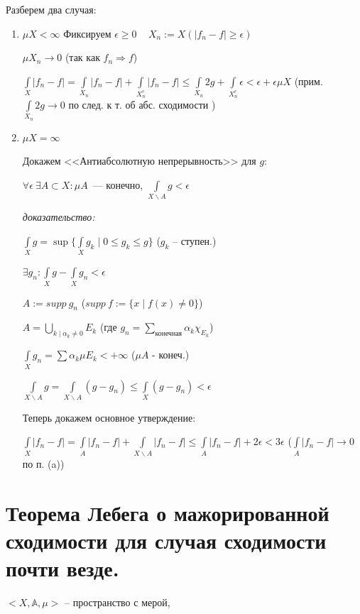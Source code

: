 \documentclass[paper=a4, fontsize=17pt]{article}
\begin{document}
\begin{flushleft}
\begin{enumerate}
	Разберем два случая:
	\begin{enumerate}
		\item $ \mu X < \infty $
		Фиксируем $ \epsilon \ge 0 $ ~ $ X_n := X(|f_n - f| \geq \epsilon) $

		$ \mu X_n \rightarrow 0 $ (так как $ f_n \Rightarrow f $)

		$ \int\limits_{X} |f_n - f| =
		\int\limits_{X_n} |f_n - f| + \int\limits_{X_n^c} |f_n - f| \leq
		\int\limits_{X_n} 2g + \int\limits_{X_n^c} \epsilon < \epsilon + \epsilon \mu X $ (прим. $ \int\limits_{X_n} 2g \rightarrow 0 $ по след. к т. об абс. сходимости )

		\item $ \mu X = \infty $

		Докажем <<Антиабсолютную непрерывность>> для $ g $:

		$ \forall \epsilon ~ \exists A \subset X: \mu A$~--- конечно,
		$ \int\limits_{X\backslash A} g < \epsilon $

		\textit{доказательство:}

		$ \int\limits_X g = \sup \{ \int\limits_{X} g_k \mid 0 \leq g_k \leq g \} $ ($ g_k $ -- ступен.)

		$ \exists g_n: \int\limits_{X} g - \int\limits_{X} g_n < \epsilon $

		$ A:= supp\ g_n $ ($ supp\ f :=  \{ x \mid f(x) \neq 0 \}$)

		$ A =  \bigcup\limits_{k \mid \alpha_k \neq 0} E_k $ (где $g_n=\sum\limits_{\text{конечная}} \alpha_k \chi_{E_k}$)

		$ \int\limits_{X} g_n  = \sum \alpha_k \mu E_k  < +\infty $ ($ \mu A $ - конеч.)

		$ \int\limits_{X\backslash A} g =
		\int\limits_{X\backslash A} (g - g_n) \leq
		\int\limits_{X} (g - g_n) < \epsilon $

		Теперь докажем основное утверждение:

		 $ \int\limits_{X} |f_n - f| =
		 \int\limits_{A} |f_n - f| + \int\limits_{X\backslash A} |f_n - f| \leq
		 \int\limits_{A} |f_n - f| + 2\epsilon < 3 \epsilon $
		 ($  \int\limits_{A} |f_n - f| \rightarrow 0$  по п. (a))
	\end{enumerate}
\end{enumerate}
\end{flushleft}
\section{Теорема Лебега о мажорированной сходимости для случая сходимости почти везде.}
$<X, \mathds{A}, \mu>$ -- пространство с мерой,
\end{document}

